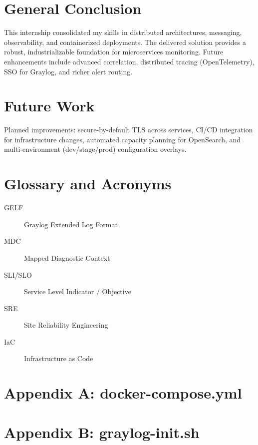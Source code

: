 \documentclass[12pt,a4paper]{report}
\begin{document}
\chapter*{General Conclusion}
This internship consolidated my skills in distributed architectures, messaging, observability, and containerized deployments. The delivered solution provides a robust, industrializable foundation for microservices monitoring. Future enhancements include advanced correlation, distributed tracing (OpenTelemetry), SSO for Graylog, and richer alert routing.

\chapter*{Future Work}
Planned improvements: secure-by-default TLS across services, CI/CD integration for infrastructure changes, automated capacity planning for OpenSearch, and multi-environment (dev/stage/prod) configuration overlays.

\chapter*{Glossary and Acronyms}
\begin{description}
  \item[GELF] Graylog Extended Log Format
  \item[MDC] Mapped Diagnostic Context
  \item[SLI/SLO] Service Level Indicator / Objective
  \item[SRE] Site Reliability Engineering
  \item[IaC] Infrastructure as Code
\end{description}

\appendix
\chapter{Appendix A: docker-compose.yml}

\chapter{Appendix B: graylog-init.sh}
\end{document}
